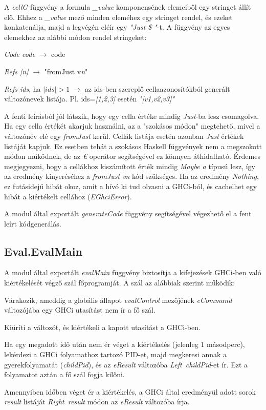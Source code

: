 A \textit{cellG} függvény a formula \textit{\_value} komponensének elemeiből egy stringet állít elő. Ehhez a \textit{\_value} mező minden eleméhez egy stringet rendel, és ezeket konkatenálja, majd a legvégén eléír egy \textit{"Just \$ "}-t. A függvény az egyes elemekhez az alábbi módon rendel stringeket:
\begin{compactenum}
	\item \textit{Code code} $\rightarrow$ code
	\item \textit{Refs [n]} $\rightarrow$ "fromJust v\textit{n}"
	\item \textit{Refs ids}, ha $|ids| > 1 \ \rightarrow$ az ids-ben szereplő cellaazonosítókból generált változónevek listája. Pl. ids=\textit{[1,2,3]} esetén \textit{"[v1,v2,v3]"}
\end{compactenum}

A fenti leírásból jól látszik, hogy egy cella értéke mindig \textit{Just}-ba lesz csomagolva. Ha egy cella értékét akarjuk használni, az a "szokásos módon" megtehető, mivel a változónév elé egy \textit{fromJust} kerül. Cellák listája esetén azonban \textit{Just} értékek listáját kapjuk. Ez esetben tehát a szokásos Haskell függvények nem a megszokott módon működnek, de az \textit{€} operátor segítségével ez könnyen áthidalható. Érdemes megjegyezni, hogy a cellákhoz kiszámított érték mindig \textit{Maybe a} típusú lesz, így az eredmény kinyeréséhez a \textit{fromJust vn} kód szükséges. Ha az eredmény \textit{Nothing}, ez futásidejű hibát okoz, amit a hívó ki tud olvasni a GHCi-ból, és cachelhet egy hibát a kiértékelt cellához (\textit{EGhciError}).

A modul által exportált \textit{generateCode} függvény segítségével végezhető el a fent leírt kódgenerálás. 

\subsection{Eval.EvalMain}

A modul által exportált \textit{evalMain} függvény biztosítja a kifejezések GHCi-ben való kiértékelését végző szál főprogramját. A szál az alábbiak szerint működik:

\begin{compactenum}
	\item Várakozik, ameddig a globális állapot \textit{evalControl} mezőjének \textit{eCommand} változójába egy GHCi utasítást nem ír a fő szál.
	\item Kiüríti a változót, és kiértékeli a kapott utasítást a GHCi-ben.
	\item Ha egy megadott idő után nem ér véget a kiértékelés (jelenleg 1 másodperc), lekérdezi a GHCi folyamathoz tartozó PID-et, majd megkeresi annak a gyerekfolyamatát (\textit{childPid}), és az \textit{eResult} változóba \textit{Left\ childPid}-et ír. Ezt a folyamatot aztán a fő szál fogja kilőni.
	\item Amennyiben időben véget ér a kiértékelés, a GHCi által eredményül adott sorok \textit{result} listáját \textit{Right\ result} módon az \textit{eResult} változóba írja.
\end{compactenum}

